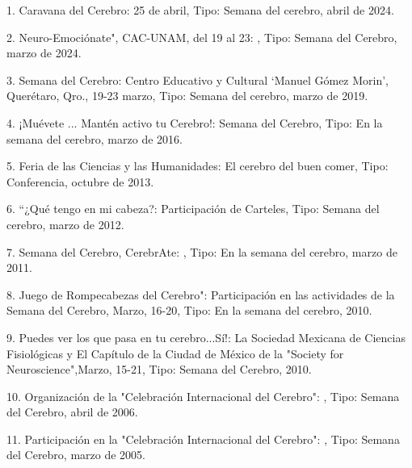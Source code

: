 1. Caravana del Cerebro: 25 de abril, Tipo: Semana del cerebro, abril de 2024.

2. Neuro-Emociónate", CAC-UNAM, del 19 al 23: , Tipo: Semana del Cerebro, marzo de 2024.

3. Semana del Cerebro: Centro Educativo y Cultural ‘Manuel Gómez Morin’, Querétaro, Qro., 19-23 
marzo, Tipo: Semana del cerebro, marzo de 2019.

4. ¡Muévete ... Mantén activo tu Cerebro!: Semana del Cerebro, Tipo: En la semana del cerebro, marzo 
de 2016.

5. Feria de las Ciencias y las Humanidades: El cerebro del buen comer, Tipo: Conferencia, octubre de 
2013.

6. “¿Qué tengo en mi cabeza?: Participación de Carteles, Tipo: Semana del cerebro, marzo de 2012.

7. Semana del Cerebro, CerebrAte: , Tipo: En la semana del cerebro, marzo de 2011.

8. Juego de Rompecabezas del Cerebro": Participación en las actividades de la Semana del Cerebro, 
Marzo, 16-20, Tipo: En la semana del cerebro, 2010.

9. Puedes ver los que pasa en tu cerebro...Sí!: La Sociedad Mexicana de Ciencias Fisiológicas y El 
Capítulo de la Ciudad de México de la "Society for Neuroscience",Marzo, 15-21, Tipo: Semana del 
Cerebro, 2010.

10. Organización de la "Celebración Internacional del Cerebro": , Tipo: Semana del Cerebro, abril de 
2006.

11. Participación en la "Celebración Internacional del Cerebro": , Tipo: Semana del Cerebro, marzo 
de 2005.


